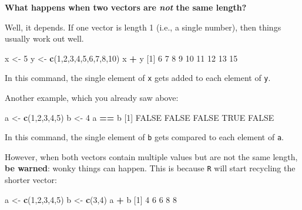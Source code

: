 \documentclass[]{book}
\newenvironment{Shaded}{\begin{snugshade}}{\end{snugshade}}
\newcommand{\DecValTok}[1]{\textcolor[rgb]{0.00,0.00,0.81}{#1}}
\newcommand{\KeywordTok}[1]{\textcolor[rgb]{0.13,0.29,0.53}{\textbf{#1}}}
\newcommand{\NormalTok}[1]{#1}
\newcommand{\OperatorTok}[1]{\textcolor[rgb]{0.81,0.36,0.00}{\textbf{#1}}}
\newcommand{\OtherTok}[1]{\textcolor[rgb]{0.56,0.35,0.01}{#1}}
\newcommand{\StringTok}[1]{\textcolor[rgb]{0.31,0.60,0.02}{#1}}
\begin{document}
\textbf{What happens when two vectors are \emph{not} the same length?}

Well, it depends. If one vector is length 1 (i.e., a single number), then things usually work out well.

\begin{Shaded}
\begin{Highlighting}[]
\NormalTok{x <-}\StringTok{ }\DecValTok{5}
\NormalTok{y <-}\StringTok{ }\KeywordTok{c}\NormalTok{(}\DecValTok{1}\NormalTok{,}\DecValTok{2}\NormalTok{,}\DecValTok{3}\NormalTok{,}\DecValTok{4}\NormalTok{,}\DecValTok{5}\NormalTok{,}\DecValTok{6}\NormalTok{,}\DecValTok{7}\NormalTok{,}\DecValTok{8}\NormalTok{,}\DecValTok{10}\NormalTok{)}
\NormalTok{x }\OperatorTok{+}\StringTok{ }\NormalTok{y}
\NormalTok{[}\DecValTok{1}\NormalTok{]  }\DecValTok{6}  \DecValTok{7}  \DecValTok{8}  \DecValTok{9} \DecValTok{10} \DecValTok{11} \DecValTok{12} \DecValTok{13} \DecValTok{15}
\end{Highlighting}
\end{Shaded}

In this command, the single element of \texttt{x} gets added to each element of \texttt{y}.

Another example, which you already saw above:

\begin{Shaded}
\begin{Highlighting}[]
\NormalTok{a <-}\StringTok{ }\KeywordTok{c}\NormalTok{(}\DecValTok{1}\NormalTok{,}\DecValTok{2}\NormalTok{,}\DecValTok{3}\NormalTok{,}\DecValTok{4}\NormalTok{,}\DecValTok{5}\NormalTok{)}
\NormalTok{b <-}\StringTok{ }\DecValTok{4}
\NormalTok{a }\OperatorTok{==}\StringTok{ }\NormalTok{b}
\NormalTok{[}\DecValTok{1}\NormalTok{] }\OtherTok{FALSE} \OtherTok{FALSE} \OtherTok{FALSE}  \OtherTok{TRUE} \OtherTok{FALSE}
\end{Highlighting}
\end{Shaded}

In this command, the single element of \texttt{b} gets compared to each element of \texttt{a}.

However, when both vectors contain multiple values but are not the same length, \textbf{be warned}: wonky things can happen. This is because \texttt{R} will start recycling the shorter vector:

\begin{Shaded}
\begin{Highlighting}[]
\NormalTok{a <-}\StringTok{ }\KeywordTok{c}\NormalTok{(}\DecValTok{1}\NormalTok{,}\DecValTok{2}\NormalTok{,}\DecValTok{3}\NormalTok{,}\DecValTok{4}\NormalTok{,}\DecValTok{5}\NormalTok{)}
\NormalTok{b <-}\StringTok{ }\KeywordTok{c}\NormalTok{(}\DecValTok{3}\NormalTok{,}\DecValTok{4}\NormalTok{)}
\NormalTok{a }\OperatorTok{+}\StringTok{ }\NormalTok{b}
\NormalTok{[}\DecValTok{1}\NormalTok{] }\DecValTok{4} \DecValTok{6} \DecValTok{6} \DecValTok{8} \DecValTok{8}
\end{Highlighting}
\end{Shaded}
\end{document}
